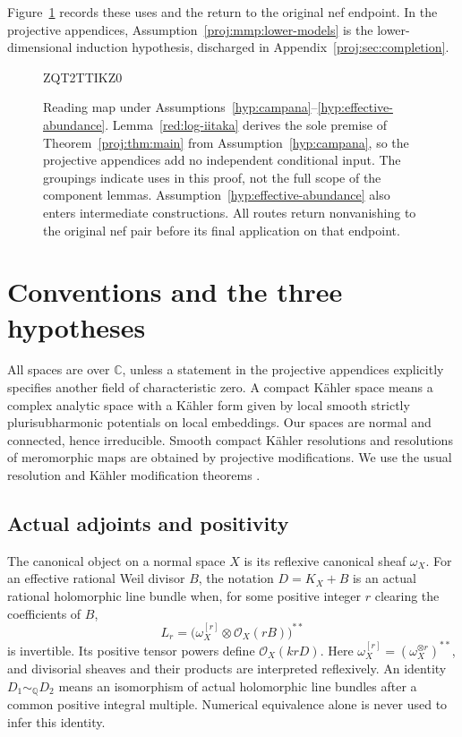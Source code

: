 \documentclass[11pt,letterpaper]{article}
\theoremstyle{definition}
\theoremstyle{remark}
\begin{document}
Figure~\ref{fig:proof-map} records these uses and the return to the
original nef endpoint. In the projective appendices,
Assumption~\ref{proj:mmp:lower-models} is the lower-dimensional induction
hypothesis, discharged in Appendix~\ref{proj:sec:completion}.
\begin{figure}[!t]

ZQT2TTIKZ0
\caption{Reading map under Assumptions~\ref{hyp:campana}--\ref{hyp:effective-abundance}.
Lemma~\ref{red:log-iitaka} derives the sole premise of Theorem~\ref{proj:thm:main}
from Assumption~\ref{hyp:campana},
so the projective appendices add no independent conditional input.
The groupings indicate uses in this proof, not the full scope of the
component lemmas. Assumption~\ref{hyp:effective-abundance} also enters
intermediate constructions. All routes return nonvanishing to the
original nef pair before its final application on that endpoint.}
\label{fig:proof-map}
\end{figure}


\section{Conventions and the three hypotheses}\label{sec:premises}

All spaces are over \(\mathbb{C}\), unless a statement in the projective
appendices explicitly specifies another field of characteristic zero.
A compact K\"ahler space means a complex analytic space with a
K\"ahler form given by local smooth strictly plurisubharmonic potentials
on local embeddings. Our spaces are normal and connected, hence
irreducible. Smooth compact K\"ahler resolutions and resolutions of
meromorphic maps are obtained by projective modifications. We use the
usual resolution and K\"ahler modification theorems
\cite{HironakaResolution,VarouchasKahler}.

\subsection{Actual adjoints and positivity}

The canonical object on a normal space \(X\) is its reflexive canonical
sheaf \(\omega_X\). For an effective rational Weil divisor \(B\), the
notation \(D=K_X+B\) is an actual rational holomorphic line bundle
when, for some positive integer \(r\) clearing the coefficients of
\(B\),
\[
 L_r=\bigl(\omega_X^{[r]}\otimes\mathcal{O}_X(rB)\bigr)^{**}
\]
is invertible. Its positive tensor powers define \(\mathcal{O}_X(krD)\).
Here \(\omega_X^{[r]}=(\omega_X^{\otimes r})^{**}\), and divisorial
sheaves and their products are interpreted reflexively. An identity
\(D_1\sim_{\mathbb{Q}}D_2\) means an isomorphism of actual holomorphic line
bundles after a common positive integral multiple. Numerical equivalence
alone is never used to infer this identity.
\end{document}

